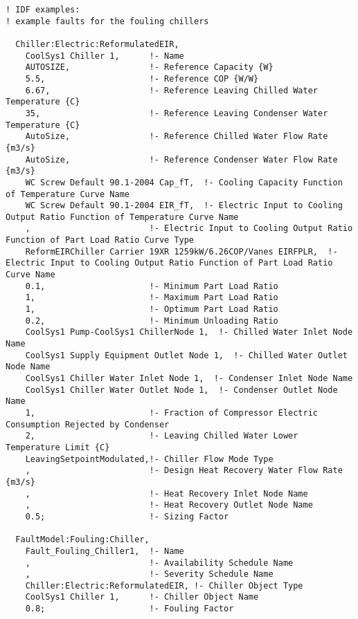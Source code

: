 \begin{lstlisting}
! IDF examples:
! example faults for the fouling chillers

  Chiller:Electric:ReformulatedEIR,
    CoolSys1 Chiller 1,      !- Name
    AUTOSIZE,                !- Reference Capacity {W}
    5.5,                     !- Reference COP {W/W}
    6.67,                    !- Reference Leaving Chilled Water Temperature {C}
    35,                      !- Reference Leaving Condenser Water Temperature {C}
    AutoSize,                !- Reference Chilled Water Flow Rate {m3/s}
    AutoSize,                !- Reference Condenser Water Flow Rate {m3/s}
    WC Screw Default 90.1-2004 Cap_fT,  !- Cooling Capacity Function of Temperature Curve Name
    WC Screw Default 90.1-2004 EIR_fT,  !- Electric Input to Cooling Output Ratio Function of Temperature Curve Name
    ,                        !- Electric Input to Cooling Output Ratio Function of Part Load Ratio Curve Type
    ReformEIRChiller Carrier 19XR 1259kW/6.26COP/Vanes EIRFPLR,  !- Electric Input to Cooling Output Ratio Function of Part Load Ratio Curve Name
    0.1,                     !- Minimum Part Load Ratio
    1,                       !- Maximum Part Load Ratio
    1,                       !- Optimum Part Load Ratio
    0.2,                     !- Minimum Unloading Ratio
    CoolSys1 Pump-CoolSys1 ChillerNode 1,  !- Chilled Water Inlet Node Name
    CoolSys1 Supply Equipment Outlet Node 1,  !- Chilled Water Outlet Node Name
    CoolSys1 Chiller Water Inlet Node 1,  !- Condenser Inlet Node Name
    CoolSys1 Chiller Water Outlet Node 1,  !- Condenser Outlet Node Name
    1,                       !- Fraction of Compressor Electric Consumption Rejected by Condenser
    2,                       !- Leaving Chilled Water Lower Temperature Limit {C}
    LeavingSetpointModulated,!- Chiller Flow Mode Type
    ,                        !- Design Heat Recovery Water Flow Rate {m3/s}
    ,                        !- Heat Recovery Inlet Node Name
    ,                        !- Heat Recovery Outlet Node Name
    0.5;                     !- Sizing Factor

  FaultModel:Fouling:Chiller,
    Fault_Fouling_Chiller1,  !- Name
    ,                        !- Availability Schedule Name
    ,                        !- Severity Schedule Name
    Chiller:Electric:ReformulatedEIR, !- Chiller Object Type
    CoolSys1 Chiller 1,      !- Chiller Object Name
    0.8;                     !- Fouling Factor

\end{lstlisting}


